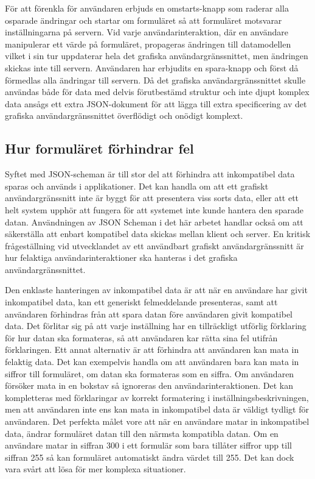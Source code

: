 För att förenkla för användaren erbjuds en omstarts-knapp som raderar alla osparade ändringar och startar om formuläret så att formuläret motsvarar inställningarna på servern. Vid varje användarinteraktion, där en användare manipulerar ett värde på formuläret, propageras ändringen till datamodellen vilket i sin tur uppdaterar hela det grafiska användargränssnittet, men ändringen skickas inte till servern. Användaren har erbjudits en spara-knapp och först då förmedlas alla ändringar till servern. Då det grafiska användargränssnittet skulle användas både för data med delvis förutbestämd struktur och inte djupt komplex data ansågs ett extra JSON-dokument för att lägga till extra specificering av det grafiska användargränssnittet överflödigt och onödigt komplext.


\subsection{Hur formuläret förhindrar fel}

Syftet med JSON-scheman är till stor del att förhindra att inkompatibel data sparas och används i applikationer. Det kan handla om att ett grafiskt användargränssnitt inte är byggt för att presentera viss sorts data, eller att ett helt system upphör att fungera för att systemet inte kunde hantera den sparade datan. Användningen av JSON Scheman i det här arbetet handlar också om att säkerställa att enbart kompatibel data skickas mellan klient och server. En kritisk frågeställning vid utvecklandet av ett användbart grafiskt användargränssnitt är hur felaktiga användarinteraktioner ska hanteras i det grafiska användargränssnittet.

Den enklaste hanteringen av inkompatibel data är att när en användare har givit inkompatibel data, kan ett generiskt felmeddelande presenteras, samt att användaren förhindras från att spara datan före användaren givit kompatibel data. Det förlitar sig på att varje inställning har en tillräckligt utförlig förklaring för hur datan ska formateras, så att användaren kar rätta sina fel utifrån förklaringen. Ett annat alternativ är att förhindra att användaren kan mata in felaktig data. Det kan exempelvis handla om att användaren bara kan mata in siffror till formuläret, om datan ska formateras som en siffra. Om användaren försöker mata in en bokstav så ignoreras den användarinteraktionen. Det kan kompletteras med förklaringar av korrekt formatering i inställningsbeskrivningen, men att användaren inte ens kan mata in inkompatibel data är väldigt tydligt för användaren. Det perfekta målet vore att när en användare matar in inkompatibel data, ändrar formuläret datan till den närmsta kompatibla datan. Om en användare matar in siffran 300 i ett formulär som bara tillåter siffror upp till siffran 255 så kan formuläret automatiskt ändra värdet till 255. Det kan dock vara svårt att lösa för mer komplexa situationer.

